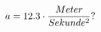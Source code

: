 \documentclass[preview]{standalone}
\begin{document}
\begin{align*}
\special{dvisvgm:raw <g id='unique000'>}a = 12.3 \cdot \frac{Meter}{Sekunde^{2}} ?\special{dvisvgm:raw </g>}
\end{align*}
\end{document}
